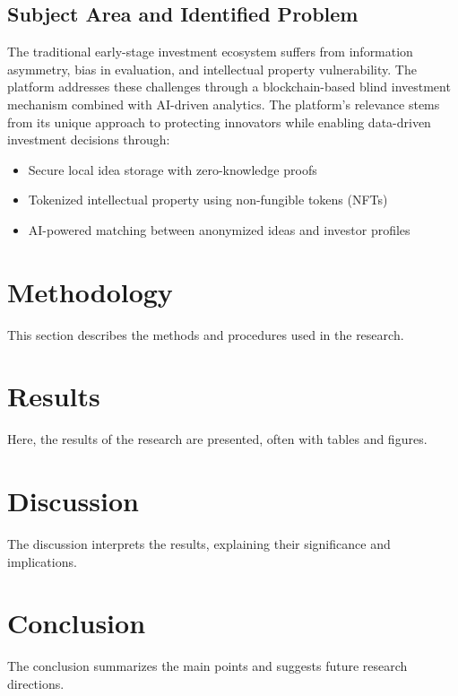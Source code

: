 \documentclass[12pt]{article}
\begin{document}
\subsection{Subject Area and Identified Problem}
The traditional early-stage investment ecosystem suffers from information asymmetry, bias in evaluation, and intellectual property vulnerability. The platform addresses these challenges through a blockchain-based blind investment mechanism combined with AI-driven analytics. The platform's relevance stems from its unique approach to protecting innovators while enabling data-driven investment decisions through:
\begin{itemize}
    \item Secure local idea storage with zero-knowledge proofs
    \item Tokenized intellectual property using non-fungible tokens (NFTs)
    \item AI-powered matching between anonymized ideas and investor profiles
\end{itemize}


\section{Methodology}
This section describes the methods and procedures used in the research.

\section{Results}
Here, the results of the research are presented, often with tables and figures.

\section{Discussion}
The discussion interprets the results, explaining their significance and implications.

\section{Conclusion}
The conclusion summarizes the main points and suggests future research directions.



\end{document}
